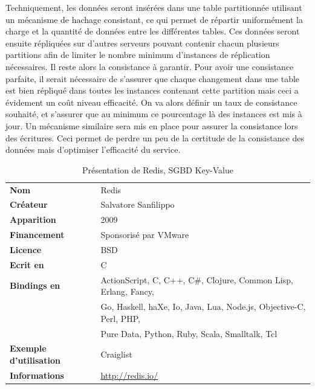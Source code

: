 \documentclass[11pt]{article}
\begin{document}
Techniquement, les données seront insérées dans une table partitionnée utilisant un mécanisme de hachage consistant, ce qui permet de répartir uniformément la charge et la quantité de données entre les différentes tables. Ces données seront ensuite répliquées sur d'autres serveurs pouvant contenir chacun plusieurs partitions afin de limiter le nombre minimum d'instances de réplication nécessaires. Il reste alors la consistance à garantir. Pour avoir une consistance parfaite, il serait nécessaire de s'assurer que chaque changement dans une table est bien répliqué dans toutes les instances contenant cette partition mais ceci a évidement un coût niveau efficacité. On va alors définir un taux de consistance souhaité, et s'assurer que au minimum ce pourcentage là des instances est mis à jour. Un mécanisme similaire sera mis en place pour assurer la consistance lors des écritures. Ceci permet de perdre un peu de la certitude de la consistance des données mais d'optimiser l'efficacité du service.
\begin{table}[H]
  \centering
  \begin{tabular}{l | l}
    \textbf{Nom} & Redis \\
    \textbf{Créateur} & Salvatore Sanfilippo \\
    \textbf{Apparition} & 2009 \\
    \textbf{Financement} & Sponsorisé par VMware \\
    \textbf{Licence} & BSD \\
    \textbf{Ecrit en} & C \\
    \textbf{Bindings en} & ActionScript, C, C++, C\#, Clojure, Common Lisp, Erlang, Fancy, \\
    &  Go, Haskell, haXe, Io, Java, Lua, Node.js, Objective-C, Perl, PHP, \\
    & Pure Data, Python, Ruby, Scala, Smalltalk, Tcl\\
    \textbf{Exemple d'utilisation} & Craiglist \\
    \textbf{Informations} & \url{http://redis.io/}
  \end{tabular}
  \caption{Présentation de Redis, SGBD Key-Value}
\end{table}
\end{document}
